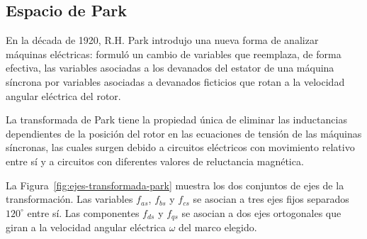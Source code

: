 \documentclass[blue,fullpaper]{ludusofficial}  %
\begin{document}

\subsection{Espacio de Park}

En la década de 1920, R.H. Park introdujo una nueva forma de analizar máquinas eléctricas: formuló un cambio de variables que reemplaza, de forma efectiva, las variables asociadas a los devanados del estator de una máquina síncrona por variables asociadas a devanados ficticios que rotan a la velocidad angular eléctrica del rotor.

La transformada de Park tiene la propiedad única de eliminar las inductancias dependientes de la posición del rotor en las ecuaciones de tensión de las máquinas síncronas, las cuales surgen debido a circuitos eléctricos con movimiento relativo entre sí y a circuitos con diferentes valores de reluctancia magnética.

La Figura~\ref{fig:ejes-transformada-park} muestra los dos conjuntos de ejes de la transformación. Las variables $f_{as}$, $f_{bs}$ y $f_{cs}$ se asocian a tres ejes fijos separados $120^\circ$ entre sí. Las componentes $f_{ds}$ y $f_{qs}$ se asocian a dos ejes ortogonales que giran a la velocidad angular eléctrica $\omega$ del marco elegido.
\end{document}
